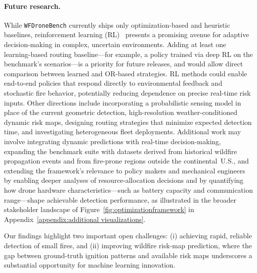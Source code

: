 \documentclass{article}
\begin{document}
\paragraph{Future research.} 
While \texttt{WFDroneBench} currently ships only optimization-based and heuristic baselines, reinforcement learning (RL)~\cite{electronics13132568} presents a promising avenue for adaptive decision-making in complex, uncertain environments. Adding at least one learning-based routing baseline---for example, a policy trained via deep RL on the benchmark's scenarios---is a priority for future releases, and would allow direct comparison between learned and OR-based strategies. RL methods could enable end-to-end policies that respond directly to environmental feedback and stochastic fire behavior, potentially reducing dependence on precise real-time risk inputs. Other directions include incorporating a probabilistic sensing model in place of the current geometric detection, high-resolution weather-conditioned dynamic risk maps, designing routing strategies that minimize expected detection time, and investigating heterogeneous fleet deployments. Additional work may involve integrating dynamic predictions with real-time decision-making, expanding the benchmark suite with datasets derived from historical wildfire propagation events and from fire-prone regions outside the continental~U.S., and extending the framework's relevance to policy makers and mechanical engineers by enabling deeper analyses of resource-allocation decisions and by quantifying how drone hardware characteristics---such as battery capacity and communication range---shape achievable detection performance, as illustrated in the broader stakeholder landscape of Figure~\ref{fig:optimizationframework} in Appendix~\ref{appendix:additional visualizations}.

Our findings highlight two important open challenges: (i) achieving rapid, reliable detection of small fires, and (ii) improving wildfire risk-map prediction, where the gap between ground-truth ignition patterns and available risk maps underscores a substantial opportunity for machine learning innovation.

\end{document}
